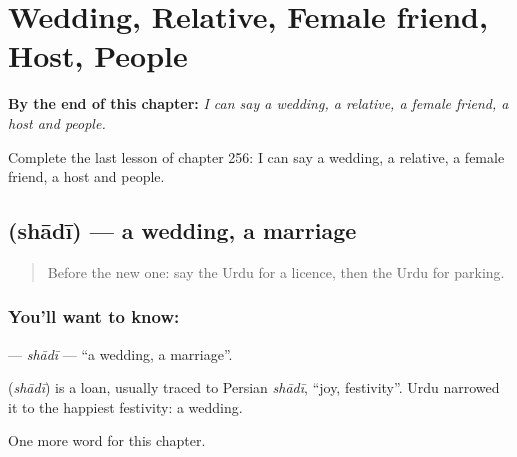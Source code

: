 
\chapter{Wedding, Relative, Female friend, Host, People}
\label{ch:ur-wedding-relative-female-friend-host-people}

\begin{chapteropening}
\textbf{By the end of this chapter:} \emph{I can say a wedding, a relative, a female friend, a host and people.}

Complete the last lesson of chapter 256: I can say a wedding, a relative, a female friend, a host and people.
\end{chapteropening}

\section[\texorpdfstring{\ur{شادی} (shādī)}{شادی (shādī)}]{ (shādī) — a wedding, a marriage}

\label{lesson:UR-C256-shadi}



\begin{quote}
Before the new one: say the Urdu for a licence, then the Urdu for parking.
\end{quote}

\subsection*{You'll want to know: }
\textbf{} — \emph{shādī} — \textquotedblleft{}a wedding, a marriage\textquotedblright{}.

\begin{cousinweb}
\textbf{} (\emph{shādī}) is a loan, usually traced to Persian \emph{shādī}, \textquotedblleft{}joy, festivity\textquotedblright{}. Urdu narrowed it to the happiest festivity: a wedding.
\end{cousinweb}

\begin{grammarlens}[title={What you've built}]
One more word for this chapter.
\end{grammarlens}

